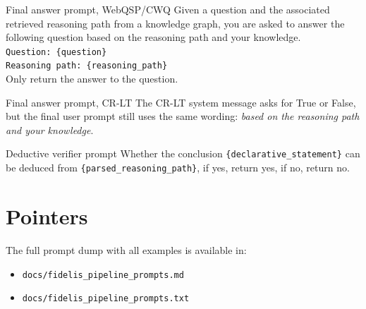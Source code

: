 \documentclass[10pt]{article}
\begin{document}
\begin{promptbox}{Final answer prompt, WebQSP/CWQ}
\small
Given a question and the associated retrieved reasoning path from a knowledge graph, you are asked to answer the following question based on the reasoning path and your knowledge.\\
\texttt{Question: \{question\}}\\
\texttt{Reasoning path: \{reasoning\_path\}}\\
Only return the answer to the question.
\end{promptbox}

\begin{promptbox}{Final answer prompt, CR-LT}
\small
The CR-LT system message asks for True or False, but the final user prompt still uses the same wording:
\emph{based on the reasoning path and your knowledge}.
\end{promptbox}

\begin{promptbox}{Deductive verifier prompt}
\small
Whether the conclusion \texttt{\{declarative\_statement\}} can be deduced from \texttt{\{parsed\_reasoning\_path\}}, if yes, return yes, if no, return no.
\end{promptbox}

\section*{Pointers}

The full prompt dump with all examples is available in:
\begin{itemize}[leftmargin=1.4em]
  \item \texttt{docs/fidelis\_pipeline\_prompts.md}
  \item \texttt{docs/fidelis\_pipeline\_prompts.txt}
\end{itemize}
\end{document}
